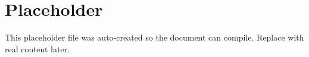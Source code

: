 \chapter{Placeholder}
This placeholder file was auto-created so the document can compile. Replace with real content later.
